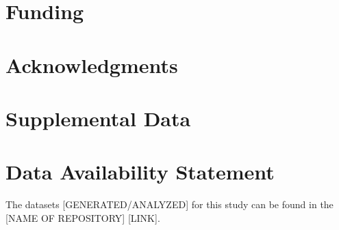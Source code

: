 \documentclass[utf8]{frontiersSCNS} %
\begin{document}
\section*{Funding}

\section*{Acknowledgments}

\section*{Supplemental Data}

\section*{Data Availability Statement}
The datasets [GENERATED/ANALYZED] for this study can be found in the [NAME OF REPOSITORY] [LINK].



\end{document}
